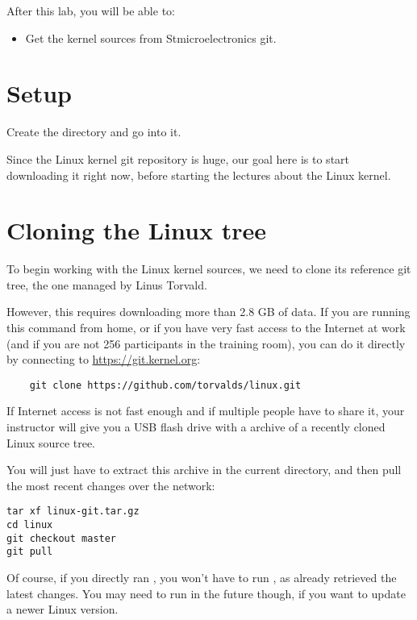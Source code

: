 
After this lab, you will be able to:
\begin{itemize}
\item Get the kernel sources from Stmicroelectronics git.
\end{itemize}

\section{Setup}

Create the  directory and go into it.

Since the Linux kernel git repository is huge, our goal here is to start
downloading it right now, before starting the lectures about the Linux
kernel.

\section{Cloning the Linux tree}

To begin working with the Linux kernel sources, we need to clone its
reference git tree, the one managed by Linus Torvald.

However, this requires downloading more than 2.8 GB of data. If you
are running this command from home, or if you have very fast access to
the Internet at work (and if you are not 256 participants in the
training room), you can do it directly by connecting to
\url{https://git.kernel.org}:

\begin{verbatim}
    git clone https://github.com/torvalds/linux.git
\end{verbatim}

If Internet access is not fast enough and if multiple people have to
share it, your instructor will give you a USB flash drive with a
 archive of a recently cloned Linux source tree.

You will just have to extract this archive in the current directory,
and then pull the most recent changes over the network:

\begin{verbatim}
tar xf linux-git.tar.gz
cd linux
git checkout master
git pull
\end{verbatim}

Of course, if you directly ran
, you won't have to run , as
 already retrieved the latest changes. You may need to
run  in the future though, if you want to update a
newer Linux version.

